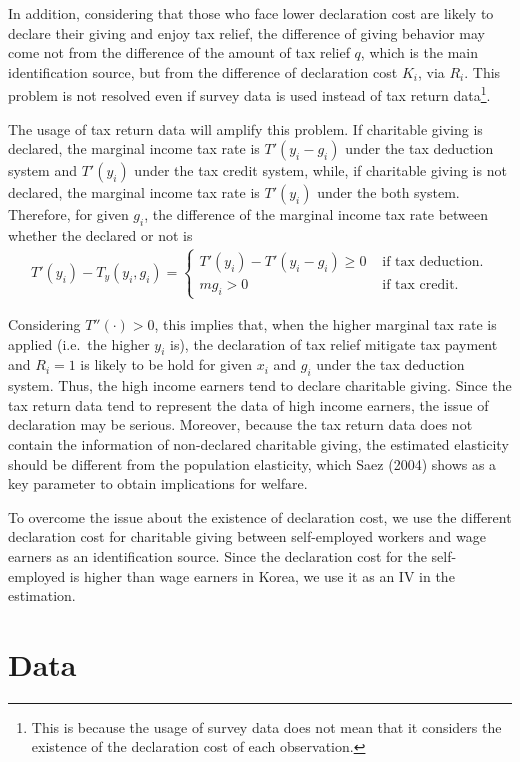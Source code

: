 \documentclass[
  11pt,
  a4paper,
]{article}
\begin{document}
In addition, considering that those who face lower declaration cost are likely to declare their giving and enjoy tax relief, the difference of giving behavior may come not from the difference of the amount of tax relief \(q\), which is the main identification source, but from the difference of declaration cost \(K_i\), via \(R_i\).
This problem is not resolved even if survey data is used instead of tax return data\footnote{This is because the usage of survey data does not mean that it considers the existence of the declaration cost of each observation.}.

The usage of tax return data will amplify this problem. If charitable giving is declared, the marginal income tax rate is \(T'(y_i-g_i)\) under the tax deduction system and \(T'(y_i)\) under the tax credit system, while, if charitable giving is not declared, the marginal income tax rate is \(T'(y_i)\) under the both system. Therefore, for given \(g_i\), the difference of the marginal income tax rate between whether the declared or not is
\begin{align}
T'(y_i)-T_y(y_i,g_i)=\begin{cases}
    T'(y_i)-T'(y_i-g_i)\ge0 &\text{ if tax deduction}.\\
    mg_i>0 &\text{ if tax credit}.
\end{cases}
\end{align}

Considering \(T''(\cdot)>0\), this implies that, when the higher marginal tax rate is applied (i.e.~the higher \(y_i\) is), the declaration of tax relief mitigate tax payment and \(R_i=1\) is likely to be hold for given \(x_i\) and \(g_i\) under the tax deduction system. Thus, the high income earners tend to declare charitable giving. Since the tax return data tend to represent the data of high income earners, the issue of declaration may be serious. Moreover, because the tax return data does not contain the information of non-declared charitable giving, the estimated elasticity should be different from the population elasticity, which Saez (2004) shows as a key parameter to obtain implications for welfare.

To overcome the issue about the existence of declaration cost, we use the different declaration cost for charitable giving between self-employed workers and wage earners as an identification source. Since the declaration cost for the self-employed is higher than wage earners in Korea, we use it as an IV in the estimation.

\hypertarget{data}{%
\section{Data}\label{data}}
\end{document}
